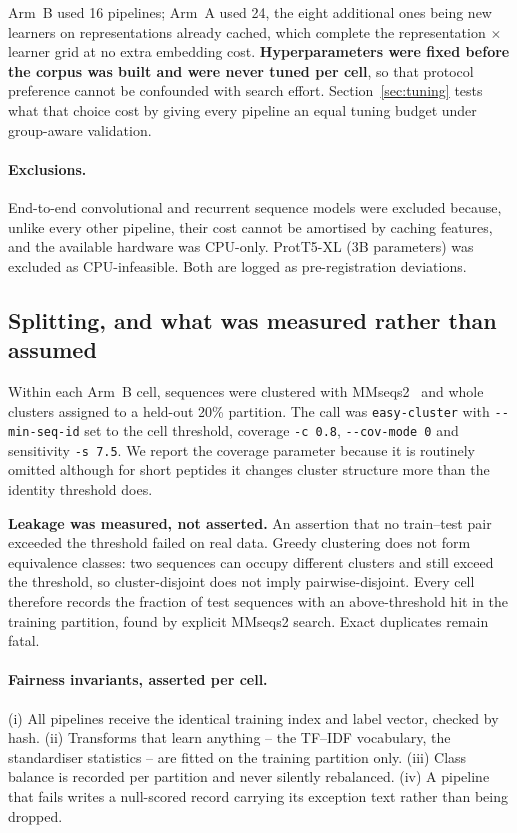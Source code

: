 \documentclass[11pt,a4paper]{article}
\begin{document}
Arm~B used 16 pipelines; Arm~A used 24, the eight additional ones being new learners on
representations already cached, which complete the representation $\times$ learner grid at
no extra embedding cost. \textbf{Hyperparameters were fixed before the corpus was built and
were never tuned per cell}, so that protocol preference cannot be confounded with search
effort. Section~\ref{sec:tuning} tests what that choice cost by giving every pipeline an
equal tuning budget under group-aware validation.

\paragraph{Exclusions.} End-to-end convolutional and recurrent sequence models were
excluded because, unlike every other pipeline, their cost cannot be amortised by caching
features, and the available hardware was CPU-only. ProtT5-XL (3B parameters) was excluded
as CPU-infeasible. Both are logged as pre-registration deviations.

\subsection{Splitting, and what was measured rather than assumed}

Within each Arm~B cell, sequences were clustered with MMseqs2~\citep{steinegger2017mmseqs2}
and whole clusters assigned to a held-out 20\% partition. The call was
\texttt{easy-cluster} with \texttt{-{}-min-seq-id} set to the cell threshold,
coverage \texttt{-c 0.8}, \texttt{-{}-cov-mode 0} and sensitivity \texttt{-s 7.5}.
We report the coverage parameter because it is routinely omitted although for short
peptides it changes cluster structure more than the identity threshold does.

\textbf{Leakage was measured, not asserted.} An assertion that no train--test pair exceeded
the threshold failed on real data. Greedy clustering does not form equivalence classes: two
sequences can occupy different clusters and still exceed the threshold, so cluster-disjoint
does not imply pairwise-disjoint. Every cell therefore records the fraction of test
sequences with an above-threshold hit in the training partition, found by explicit MMseqs2
search. Exact duplicates remain fatal.

\paragraph{Fairness invariants, asserted per cell.} (i) All pipelines receive the identical
training index and label vector, checked by hash. (ii) Transforms that learn anything --
the TF--IDF vocabulary, the standardiser statistics -- are fitted on the training partition
only. (iii) Class balance is recorded per partition and never silently rebalanced. (iv) A
pipeline that fails writes a null-scored record carrying its exception text rather than
being dropped.
\end{document}
